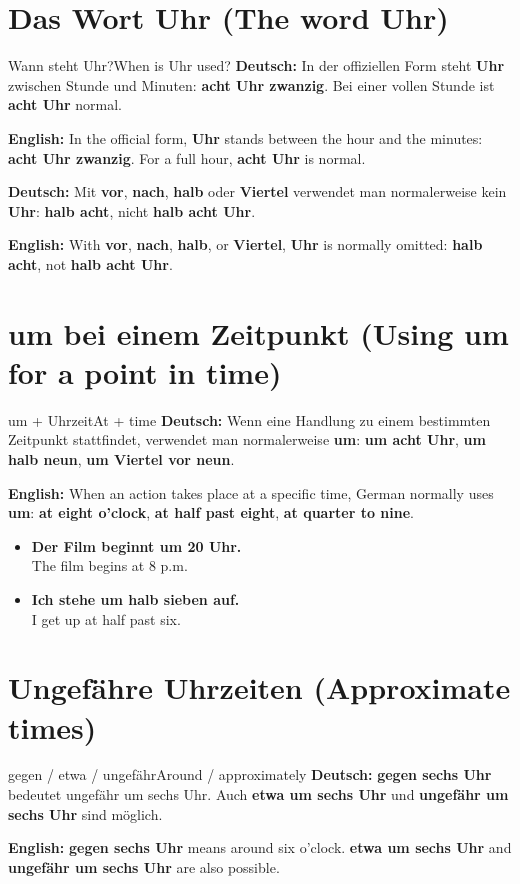 \documentclass[a4paper,11pt]{article}
\newcommand{\GermanText}[1]{\textbf{Deutsch: }#1\par}
\newcommand{\EnglishText}[1]{{\small\color{SoftGray}\textbf{English: }#1\par}}
\newcommand{\ExampleItem}[2]{\item \textbf{#1}\\{\small\color{SoftGray}#2}}
\begin{document}
\section{Das Wort Uhr \textnormal{(The word Uhr)}}
\begin{grammarentry}{Wann steht Uhr?}{When is Uhr used?}
\GermanText{In der offiziellen Form steht \textbf{Uhr} zwischen Stunde und Minuten: \textbf{acht Uhr zwanzig}. Bei einer vollen Stunde ist \textbf{acht Uhr} normal.}
\EnglishText{In the official form, \textbf{Uhr} stands between the hour and the minutes: \textbf{acht Uhr zwanzig}. For a full hour, \textbf{acht Uhr} is normal.}
\GermanText{Mit \textbf{vor}, \textbf{nach}, \textbf{halb} oder \textbf{Viertel} verwendet man normalerweise kein \textbf{Uhr}: \textbf{halb acht}, nicht \textbf{halb acht Uhr}.}
\EnglishText{With \textbf{vor}, \textbf{nach}, \textbf{halb}, or \textbf{Viertel}, \textbf{Uhr} is normally omitted: \textbf{halb acht}, not \textbf{halb acht Uhr}.}
\end{grammarentry}
\section{um bei einem Zeitpunkt \textnormal{(Using um for a point in time)}}
\begin{grammarentry}{um + Uhrzeit}{At + time}
\GermanText{Wenn eine Handlung zu einem bestimmten Zeitpunkt stattfindet, verwendet man normalerweise \textbf{um}: \textbf{um acht Uhr}, \textbf{um halb neun}, \textbf{um Viertel vor neun}.}
\EnglishText{When an action takes place at a specific time, German normally uses \textbf{um}: \textbf{at eight o'clock}, \textbf{at half past eight}, \textbf{at quarter to nine}.}
\end{grammarentry}
\begin{exbox}\begin{itemize}
\ExampleItem{Der Film beginnt um 20 Uhr.}{The film begins at 8 p.m.}
\ExampleItem{Ich stehe um halb sieben auf.}{I get up at half past six.}
\end{itemize}\end{exbox}
\section{Ungefähre Uhrzeiten \textnormal{(Approximate times)}}
\begin{grammarentry}{gegen / etwa / ungefähr}{Around / approximately}
\GermanText{\textbf{gegen sechs Uhr} bedeutet ungefähr um sechs Uhr. Auch \textbf{etwa um sechs Uhr} und \textbf{ungefähr um sechs Uhr} sind möglich.}
\EnglishText{\textbf{gegen sechs Uhr} means around six o'clock. \textbf{etwa um sechs Uhr} and \textbf{ungefähr um sechs Uhr} are also possible.}
\end{grammarentry}
\end{document}
